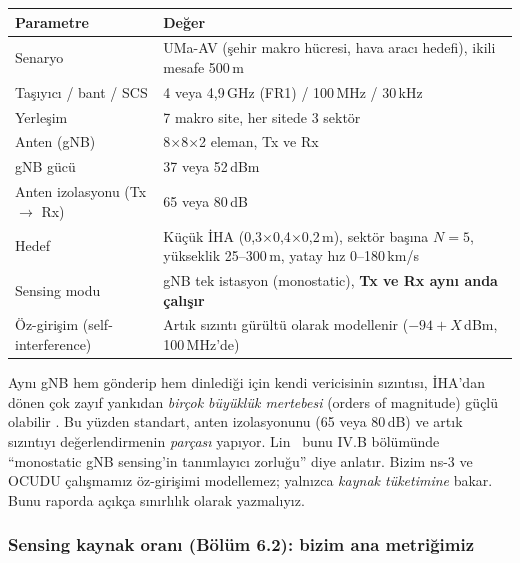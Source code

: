 \begingroup\sffamily\small
\begin{xltabular}{\textwidth}{@{}p{4.8cm}X@{}}
\toprule
\textbf{Parametre} & \textbf{Değer} \\
\midrule
Senaryo & UMa-AV (şehir makro hücresi, hava aracı hedefi), ikili mesafe 500\,m \\
Taşıyıcı / bant / SCS & 4 veya 4,9\,GHz (FR1) / 100\,MHz / 30\,kHz \\
Yerleşim & 7 makro site, her sitede 3 sektör \\
Anten (gNB) & 8$\times$8$\times$2 eleman, Tx ve Rx \\
gNB gücü & 37 veya 52\,dBm \\
Anten izolasyonu (Tx $\rightarrow$ Rx) & 65 veya 80\,dB \\
Hedef & Küçük İHA (0,3$\times$0,4$\times$0,2\,m), sektör başına $N=5$, yükseklik 25--300\,m, yatay hız 0--180\,km/s \\
Sensing modu & gNB tek istasyon (monostatic), \textbf{Tx ve Rx aynı anda çalışır} \\
Öz-girişim (self-interference) & Artık sızıntı gürültü olarak modellenir ($-94+X$\,dBm, 100\,MHz'de) \\
\bottomrule
\end{xltabular}
\endgroup

\begin{dikkat}
Aynı gNB hem gönderip hem dinlediği için kendi vericisinin sızıntısı, İHA'dan dönen çok zayıf yankıdan \emph{birçok büyüklük mertebesi} (orders of magnitude) güçlü olabilir \cite{lin}. Bu yüzden standart,
anten izolasyonunu (65 veya 80\,dB) ve artık sızıntıyı değerlendirmenin \emph{parçası} yapıyor. Lin~\cite{lin} bunu IV.B bölümünde ``monostatic gNB sensing'in tanımlayıcı zorluğu'' diye anlatır.
Bizim ns-3 ve OCUDU çalışmamız öz-girişimi modellemez; yalnızca \emph{kaynak tüketimine} bakar. Bunu raporda açıkça sınırlılık olarak yazmalıyız.
\end{dikkat}

\subsubsection{Sensing kaynak oranı (Bölüm 6.2): bizim ana metriğimiz}

